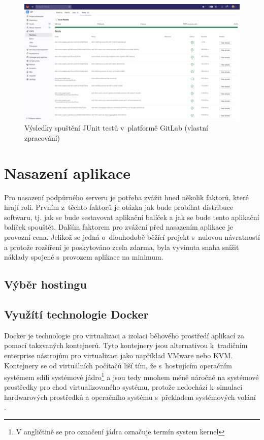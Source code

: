 \begin{figure}[htbp!]\centering
    \includegraphics[width=\textwidth]{img/gitlab-ci-junit.png}
    \caption{Výsledky spuštění JUnit testů v~platformě GitLab (vlastní zpracování)}
    \label{fig:gitlab-ci-junit}
\end{figure}
 
\section{Nasazení aplikace}

Pro nasazení podpůrného serveru je potřeba zvážit hned několik faktorů, které hrají roli. 
Prvním z~těchto faktorů je otázka jak bude probíhat distribuce softwaru, tj. jak se bude sestavovat aplikační balíček a jak se bude tento aplikační balíček spouštět. 
Dalším faktorem pro zvážení před nasazením aplikace je provozní cena. Jelikož se jedná o~dlouhodobě běžící projekt s~nulovou návratností a protože rozšíření je poskytováno zcela zdarma, byla vyvinuta snaha snížit náklady spojené s~provozem aplikace na minimum.

\subsection{Výběr hostingu}


\subsection{Využítí technologie Docker}\label{sec:docker}

Docker je technologie pro virtualizaci a izolaci běhového prostředí aplikací za pomocí takzvaných kontejnerů. Tyto kontejnery jsou alternativou k~tradičním enterprise nástrojům pro virtualizaci jako například VMware nebo KVM. Kontejnery se od virtuálních počítačů liší tím, že s~hostujícím operačním systémem sdílí systémové jádro\footnote{V angličtině se pro označení jádra označuje termín system kernel} a jsou tedy mnohem méně náročné na systémové prostředky pro chod virtualizovaného systému, protože nedochází k~simulaci hardwarových prostředků a operačního systému s~překladem systémových volání \cite[kap. 1]{kane_docker_2018}.

